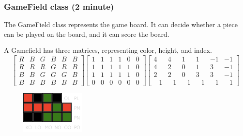 \documentclass{beamer}
\begin{document}
\begin{frame}
\frametitle{GameField class (2 minute)}
The GameField class represents the game board. It can decide whether a piece can be played on the board, and it can score the board.

A Gamefield has three matrices, representing color, height, and index.
\tiny\[
  \begin{bmatrix}
    R & B & G & B & B & B \\ 
    R & R & R & G & R & B \\ 
    B & B & G & G & G & B \\ 
    B & B & B & B & B & B
  \end{bmatrix}
  \begin{bmatrix}
    1 & 1 & 1 & 1 & 0 & 0 \\ 
    1 & 1 & 1 & 1 & 1 & 0 \\ 
    1 & 1 & 1 & 1 & 1 & 0 \\ 
    0 & 0 & 0 & 0 & 0 & 0
  \end{bmatrix}
  \begin{bmatrix}
     4 &  4 &  1 &  1 & -1 & -1 \\ 
     4 &  2 &  0 &  1 &  3 & -1 \\ 
     2 &  2 &  0 &  3 &  3 & -1 \\ 
    -1 & -1 & -1 & -1 & -1 & -1
  \end{bmatrix}
\]
\begin{figure}
\includegraphics[width=0.4\linewidth]{4}
\end{figure}
\end{frame}
\end{document}
